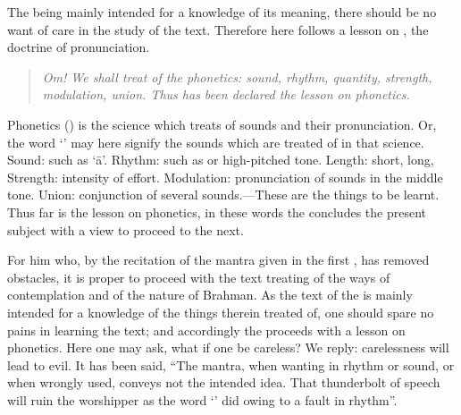 \documentclass{xminimal}
\title{\relax}
\author{\relax}
\date{\relax}
\begin{document}
\thispagestyle{empty}

The  being mainly intended for a knowledge of its meaning, there
should be no want of care in the study of the text. Therefore here follows
a lesson on , the doctrine of pronunciation.

\begin{verse}\centering



\end{verse}

\begin{quote}
  \emph{Om! We shall treat of the phonetics: sound, rhythm, quantity, strength,
    mo\-dulation, union. Thus has been declared the lesson on phonetics.}
\end{quote}

Phonetics () is the science which treats of sounds and their
pronunciation. Or, the word ‘’ may here signify the sounds \etc
which are treated of in that science. Sound: such as ‘ā’. Rhythm: such as
 or high-pitched tone. Length: short, long, \etc  Strength: intensity
of effort. Modulation: pronunciation of sounds in the middle tone. Union:
conjunction of several sounds.—These are the things to be learnt. Thus far is
the lesson on phonetics, in these words the  concludes the present
subject with a view to proceed to the next.

For him who, by the recitation of the mantra given in the first ,
has removed obstacles, it is proper to proceed with the text treating of
the ways of contemplation and of the nature of Brahman. As the text of the
 is mainly intended for a knowledge of the things therein treated
of, one should spare no pains in learning the text; and accordingly the
 proceeds with a lesson on phonetics. Here one may ask, what if one
be careless? We reply: carelessness will lead to evil. It has been said,
“The mantra, when wanting in rhythm or sound, or when wrongly used, conveys not
the intended idea. That thunderbolt of speech will ruin the worshipper as
the word ‘’ did owing to a fault in rhythm”.
\end{document}
